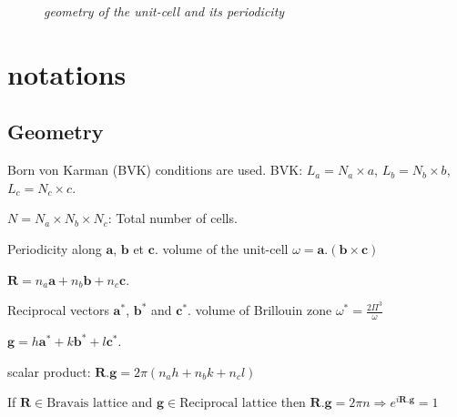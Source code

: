 \documentclass{article}
\begin{document}
\begin{figure}[!ht]
\begin{center}
\caption{\sl geometry of the unit-cell and its periodicity}
\label{fig:geom}
\end{center}
\end{figure}

\section{notations}


\subsection{Geometry}
\noindent
Born von Karman (BVK) conditions are used.
\noindent
BVK: $L_a=N_a \times a$,\; $L_b=N_b \times b$,\; $L_c=N_c \times c$.

\noindent
$N=N_a \times N_b \times N_c$: Total number of cells.

\noindent
Periodicity along $\mathbf a$, $\mathbf b$ et $\mathbf c$. volume of the unit-cell $\omega=\mathbf{a}.(\mathbf{b} \times \mathbf{c})$

$\mathbf{R}=n_a \mathbf{a}+n_b \mathbf{b}+n_c \mathbf{c}$.

\noindent
Reciprocal vectors  $\mathbf{a}^*$, $\mathbf{b}^*$ and $\mathbf{c}^*$. volume of Brillouin zone $\omega^*= \frac{2\Pi^3}{\omega}$

$\mathbf{g}= h \mathbf{a}^*+k \mathbf{b}^*+l \mathbf{c}^*$.

\noindent
scalar product: $\mathbf{R}.\mathbf{g}=2\pi(n_ah+n_bk+n_cl)$

\noindent
If $\mathbf{R} \in \text{Bravais lattice}$ and $\mathbf{g} \in \text{Reciprocal lattice}$ then $\mathbf{R}.\mathbf{g}=2\pi n \Rightarrow e^{i\mathbf{R}.\mathbf{g}}=1$
\end{document}
